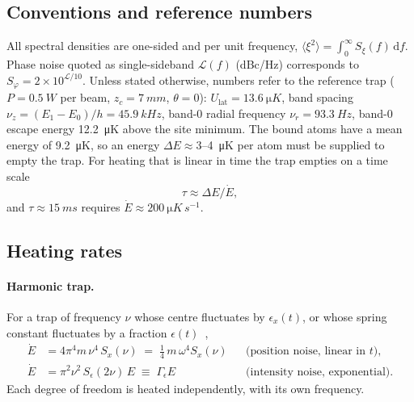 \documentclass[11pt,a4paper]{article}
\newcommand{\dd}{\mathrm{d}}
\newcommand{\Ulat}{U_\mathrm{lat}}
\begin{document}
\subsection{Conventions and reference numbers}
All spectral densities are one-sided and per unit frequency, $\langle\xi^2\rangle=\int_0^\infty S_\xi(f)\,\dd f$. Phase noise quoted as single-sideband $\mathcal L(f)$ (dBc/Hz) corresponds to $S_\varphi=2\times10^{\mathcal L/10}$. Unless stated otherwise, numbers refer to the reference trap ($P=\SI{0.5}{W}$ per beam, $z_c=\SI{7}{mm}$, $\theta=0$): $\Ulat=\SI{13.6}{\micro K}$, band spacing $\nu_z=(E_1-E_0)/h=\SI{45.9}{kHz}$, band-0 radial frequency $\nu_r=\SI{93.3}{Hz}$, band-0 escape energy \SI{12.2}{\micro K} above the site minimum. The bound atoms have a mean energy of \SI{9.2}{\micro K}, so an energy $\Delta E\approx3$--\SI{4}{\micro K} per atom must be supplied to empty the trap. For heating that is linear in time the trap empties on a time scale
\begin{equation}
\tau\approx\Delta E/\dot E ,
\label{eq:tau_heat}
\end{equation}
and $\tau\approx\SI{15}{ms}$ requires $\dot E\approx\SI{200}{\micro K\,s^{-1}}$.

\subsection{Heating rates}
\paragraph{Harmonic trap.} For a trap of frequency $\nu$ whose centre fluctuates by $\epsilon_x(t)$, or whose spring constant fluctuates by a fraction $\epsilon(t)$~\cite{Savard1997,Gehm1998,Jauregui2001},
\begin{align}
\dot E &= 4\pi^4 m\,\nu^4\,S_x(\nu) \;=\; \tfrac14\,m\,\omega^4 S_x(\nu) && \text{(position noise, linear in $t$),} \label{eq:heat_pos}\\
\dot E &= \pi^2\nu^2\,S_\epsilon(2\nu)\,E \;\equiv\;\Gamma_\epsilon E && \text{(intensity noise, exponential).} \label{eq:heat_int}
\end{align}
Each degree of freedom is heated independently, with its own frequency.
\end{document}
